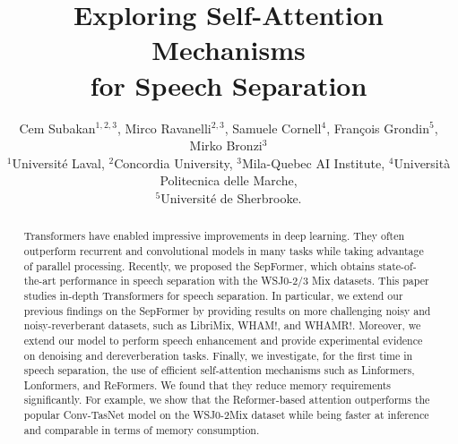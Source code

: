 \documentclass[lettersize,journal]{IEEEtran}
\begin{document}
\title{Exploring Self-Attention Mechanisms \\for Speech Separation}



\author{Cem Subakan$^{1,2,3}$, Mirco Ravanelli$^{2,3}$, Samuele Cornell$^4$, Fran\c{c}ois Grondin$^5$, Mirko Bronzi$^3$ \\$^1$Universit{\'e} Laval, $^2$Concordia University, $^3$Mila-Quebec AI Institute, $^4$Università Politecnica delle Marche, \\ $^5$Universit{\'e} de Sherbrooke. 
}
















\usetikzlibrary{arrows.meta}


\maketitle

\begin{abstract}
Transformers have enabled impressive improvements in deep learning. They often outperform recurrent and convolutional models in many tasks while taking advantage of parallel processing. Recently, we proposed the SepFormer, which obtains state-of-the-art performance in speech separation with the WSJ0-2/3 Mix datasets. This paper studies in-depth Transformers for speech separation. In particular, we extend our previous findings on the SepFormer by providing results on more challenging noisy and noisy-reverberant datasets, such as LibriMix, WHAM!, and WHAMR!. Moreover, we extend our model to perform speech enhancement and provide experimental evidence on denoising and dereverberation tasks. Finally, we investigate, for the first time in speech separation, the use of efficient self-attention mechanisms such as Linformers, Lonformers, and ReFormers. We found that they reduce memory requirements significantly. For example, we show that the Reformer-based attention outperforms the popular Conv-TasNet model on the WSJ0-2Mix dataset while being faster at inference and comparable in terms of memory consumption.











\end{abstract}
\end{document}
